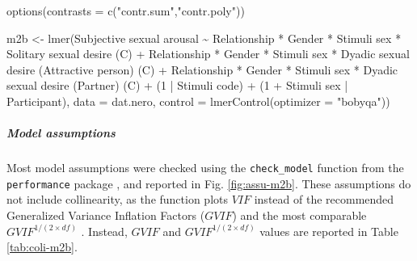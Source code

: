 \documentclass[
  bookmarksnumbered]{article}
\newenvironment{Shaded}{\begin{snugshade}}{\end{snugshade}}
\newcommand{\AttributeTok}[1]{\textcolor[rgb]{0.80,0.80,0.80}{#1}}
\newcommand{\DecValTok}[1]{\textcolor[rgb]{0.86,0.86,0.80}{#1}}
\newcommand{\FunctionTok}[1]{\textcolor[rgb]{0.94,0.94,0.56}{#1}}
\newcommand{\NormalTok}[1]{\textcolor[rgb]{0.80,0.80,0.80}{#1}}
\newcommand{\OtherTok}[1]{\textcolor[rgb]{0.94,0.94,0.56}{#1}}
\newcommand{\SpecialCharTok}[1]{\textcolor[rgb]{0.86,0.64,0.64}{#1}}
\newcommand{\StringTok}[1]{\textcolor[rgb]{0.80,0.58,0.58}{#1}}
\begin{document}
\begin{Shaded}
\begin{Highlighting}[]
\FunctionTok{options}\NormalTok{(}\AttributeTok{contrasts =} \FunctionTok{c}\NormalTok{(}\StringTok{"contr.sum"}\NormalTok{,}\StringTok{"contr.poly"}\NormalTok{))}

\NormalTok{m2b }\OtherTok{\textless{}{-}} \FunctionTok{lmer}\NormalTok{(}\StringTok{\textasciigrave{}}\AttributeTok{Subjective sexual arousal}\StringTok{\textasciigrave{}} \SpecialCharTok{\textasciitilde{}}
\NormalTok{            Relationship }\SpecialCharTok{*}\NormalTok{ Gender }\SpecialCharTok{*} \StringTok{\textasciigrave{}}\AttributeTok{Stimuli sex}\StringTok{\textasciigrave{}} \SpecialCharTok{*} \StringTok{\textasciigrave{}}\AttributeTok{Solitary sexual desire (C)}\StringTok{\textasciigrave{}} \SpecialCharTok{+}
\NormalTok{            Relationship }\SpecialCharTok{*}\NormalTok{ Gender }\SpecialCharTok{*} \StringTok{\textasciigrave{}}\AttributeTok{Stimuli sex}\StringTok{\textasciigrave{}} \SpecialCharTok{*} \StringTok{\textasciigrave{}}\AttributeTok{Dyadic sexual desire (Attractive person) (C)}\StringTok{\textasciigrave{}} \SpecialCharTok{+}
\NormalTok{            Relationship }\SpecialCharTok{*}\NormalTok{ Gender }\SpecialCharTok{*} \StringTok{\textasciigrave{}}\AttributeTok{Stimuli sex}\StringTok{\textasciigrave{}} \SpecialCharTok{*} \StringTok{\textasciigrave{}}\AttributeTok{Dyadic sexual desire (Partner) (C)}\StringTok{\textasciigrave{}} \SpecialCharTok{+}
\NormalTok{            (}\DecValTok{1} \SpecialCharTok{|} \StringTok{\textasciigrave{}}\AttributeTok{Stimuli code}\StringTok{\textasciigrave{}}\NormalTok{) }\SpecialCharTok{+}
\NormalTok{            (}\DecValTok{1} \SpecialCharTok{+} \StringTok{\textasciigrave{}}\AttributeTok{Stimuli sex}\StringTok{\textasciigrave{}} \SpecialCharTok{|}\NormalTok{ Participant),}
           \AttributeTok{data =}\NormalTok{ dat.nero,}
           \AttributeTok{control =} \FunctionTok{lmerControl}\NormalTok{(}\AttributeTok{optimizer =} \StringTok{"bobyqa"}\NormalTok{))}
\end{Highlighting}
\end{Shaded}

\hypertarget{model-assumptions-2}{%
\subparagraph{Model assumptions}\label{model-assumptions-2}}

Most model assumptions were checked using the \texttt{check\_model} function from the \texttt{performance} package \autocite{ludecke2021}, and reported in Fig. \ref{fig:assu-m2b}. These assumptions do not include collinearity, as the function plots \(VIF\) instead of the recommended Generalized Variance Inflation Factors (\(GVIF\)) and the most comparable \(GVIF^{{1}/{(2 \times df)}}\) \autocite{fox1992}. Instead, \(GVIF\) and \(GVIF^{{1}/{(2 \times df)}}\) values are reported in Table \ref{tab:coli-m2b}.
\end{document}
